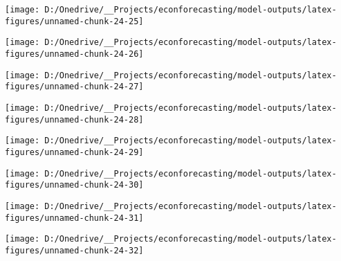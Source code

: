 \documentclass[11pt, letterpaper]{article}\usepackage[]{graphicx}\usepackage[]{color}
\begin{document}
{\centering \texttt{[image: D:/Onedrive/\_\_Projects/econforecasting/model-outputs/latex-figures/unnamed-chunk-24-25]} 

}




{\centering \texttt{[image: D:/Onedrive/\_\_Projects/econforecasting/model-outputs/latex-figures/unnamed-chunk-24-26]} 

}




{\centering \texttt{[image: D:/Onedrive/\_\_Projects/econforecasting/model-outputs/latex-figures/unnamed-chunk-24-27]} 

}




{\centering \texttt{[image: D:/Onedrive/\_\_Projects/econforecasting/model-outputs/latex-figures/unnamed-chunk-24-28]} 

}




{\centering \texttt{[image: D:/Onedrive/\_\_Projects/econforecasting/model-outputs/latex-figures/unnamed-chunk-24-29]} 

}




{\centering \texttt{[image: D:/Onedrive/\_\_Projects/econforecasting/model-outputs/latex-figures/unnamed-chunk-24-30]} 

}




{\centering \texttt{[image: D:/Onedrive/\_\_Projects/econforecasting/model-outputs/latex-figures/unnamed-chunk-24-31]} 

}




{\centering \texttt{[image: D:/Onedrive/\_\_Projects/econforecasting/model-outputs/latex-figures/unnamed-chunk-24-32]} 

}
\end{document}
